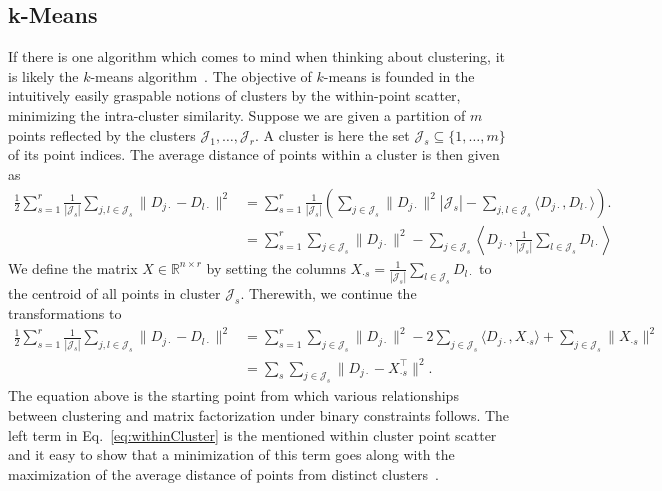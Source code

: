 \subsection{k-Means}
If there is one algorithm which comes to mind when thinking about clustering, it is likely the $k$-means algorithm~\citep{lloyd1982least}. The objective of $k$-means is founded in the intuitively easily graspable notions of clusters by the within-point scatter, minimizing the intra-cluster similarity.
Suppose we are given a partition of $m$ points reflected by the clusters $\mathcal{J}_1,\ldots, \mathcal{J}_r$. A cluster is here the set $\mathcal{J}_s\subseteq \{1,\ldots, m\}$ of its point indices. The average distance of points within a cluster is then given as
\begin{align*}
\frac{1}{2}\sum_{s=1}^r\frac{1}{|\mathcal{J}_s|}\sum_{j,l\in \mathcal{J}_s} \|D_{j\cdot}-D_{l\cdot}\|^2 
&= \sum_{s=1}^r \frac{1}{|\mathcal{J}_s|}\left(\sum_{j\in \mathcal{J}_s} \|D_{j\cdot}\|^2|\mathcal{J}_s| - \sum_{j,l\in \mathcal{J}_s}\langle D_{j\cdot},D_{l\cdot}\rangle\right).\\
&= \sum_{s=1}^r \sum_{j\in \mathcal{J}_s} \|D_{j\cdot }\|^2 -\sum_{j\in \mathcal{J}_s}\left\langle D_{j\cdot},\frac{1}{|\mathcal{J}_s|}\sum_{l\in\mathcal{J}_s}D_{l\cdot}\right\rangle
\end{align*}
We define the matrix $X\in\mathbb{R}^{n\times r}$ by setting the columns $X_{\cdot s}=\frac{1}{|\mathcal{J}_s|}\sum_{l\in\mathcal{J}_s}D_{l\cdot}$ to the centroid of all points in cluster $\mathcal{J}_s$. Therewith, we continue the transformations to
\begin{align}
\frac{1}{2}\sum_{s=1}^r\frac{1}{|\mathcal{J}_s|}\sum_{j,l\in \mathcal{J}_s} \|D_{j\cdot}-D_{l\cdot}\|^2 
&= \sum_{s=1}^r \sum_{j\in \mathcal{J}_s} \|D_{j\cdot }\|^2 -2\sum_{j\in \mathcal{J}_s}\langle D_{j\cdot},X_{\cdot s}\rangle +\sum_{j\in \mathcal{J}_s}\|X_{\cdot s}\|^2 \label{eq:withinCluster}\\
&= \sum_s \sum_{j\in \mathcal{J}_s} \|D_{j\cdot} -X_{\cdot s}^\top\|^2.\nonumber
\end{align}
The equation above is the starting point from which various relationships between clustering and matrix factorization under binary constraints follows. The left term in Eq.~\eqref{eq:withinCluster} is the mentioned within cluster point scatter and it easy to show that a minimization of this term goes along with the maximization of the average distance of points from distinct clusters~\citep{friedman2001elements}. 

